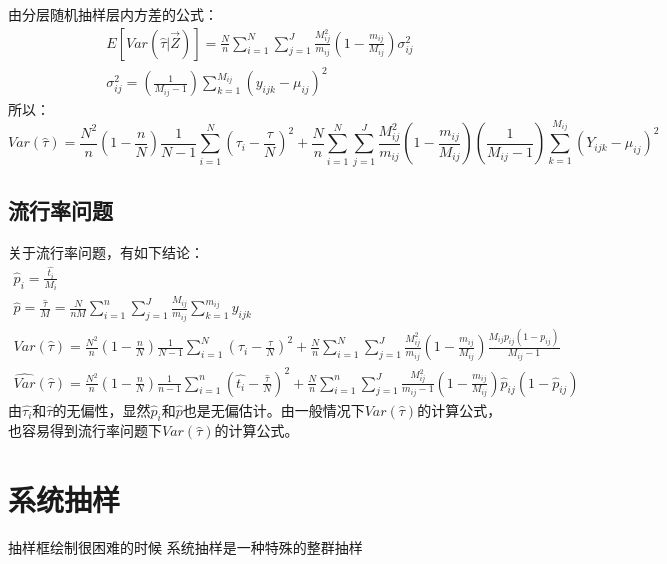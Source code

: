 由分层随机抽样层内方差的公式：
\begin{gather*}
	E[Var(\hat{\tau}|\overrightarrow{Z})]=\frac{N}{n}\sum_{i=1}^{N}\sum_{j=1}^{J}\frac{M_{ij}^2}{m_{ij}}\left(1-\frac{m_{ij}}{M_{ij}}\right)\sigma_{ij}^2 \\
	\sigma_{ij}^2=\left(\frac{1}{M_{ij}-1}\right)\sum_{k=1}^{M_{ij}}\left(y_{ijk}-\mu_{ij}\right)^2
\end{gather*}
所以：
\begin{equation*}
	Var(\hat{\tau})=\frac{N^2}{n}\left(1-\frac{n}{N}\right)\frac{1}{N-1}\sum_{i=1}^{N}\left(\tau_i-\frac{\tau}{N}\right)^2+\frac{N}{n}\sum_{i=1}^{N}\sum_{j=1}^{J}\frac{M_{ij}^2}{m_{ij}}\left(1-\frac{m_{ij}}{M_{ij}}\right)\left(\frac{1}{M_{ij}-1}\right)\sum_{k=1}^{M_{ij}}\left(Y_{ijk}-\mu_{ij}\right)^2
\end{equation*}

\subsection{流行率问题}
关于流行率问题，有如下结论：
\begin{gather*}
	\hat{p}_i=\frac{\hat{t_i}}{M_i} \\
	\hat{p}=\frac{\hat{\tau}}{M}=\frac{N}{nM}\sum_{i=1}^{n}\sum_{j=1}^{J}\frac{M_{ij}}{m_{ij}}\sum_{k=1}^{m_{ij}}y_{ijk} \\
	Var(\hat{\tau})=\frac{N^2}{n}\left(1-\frac{n}{N}\right)\frac{1}{N-1}\sum_{i=1}^{N}\left(\tau_i-\frac{\tau}{N}\right)^2+\frac{N}{n}\sum_{i=1}^{N}\sum_{j=1}^{J}\frac{M_{ij}^2}{m_{ij}}\left(1-\frac{m_{ij}}{M_{ij}}\right)\frac{M_{ij}p_{ij}(1-p_{ij})}{M_{ij}-1} \\
	\widehat{Var}(\hat{\tau})=\frac{N^2}{n}\left(1-\frac{n}{N}\right)\frac{1}{n-1}\sum_{i=1}^{n}\left(\hat{t_i}-\frac{\hat{\tau}}{N}\right)^2+\frac{N}{n}\sum_{i=1}^{n}\sum_{j=1}^{J}\frac{M_{ij}^2}{m_{ij}-1}\left(1-\frac{m_{ij}}{M_{ij}}\right)\hat{p}_{ij}(1-\hat{p}_{ij}) 
\end{gather*}
由$\hat{\tau_i}$和$\hat{\tau}$的无偏性，显然$\hat{p}_i$和$\hat{p}$也是无偏估计。由一般情况下$Var(\hat{\tau})$的计算公式，也容易得到流行率问题下$Var(\hat{\tau})$的计算公式。
\section{系统抽样}
抽样框绘制很困难的时候
系统抽样是一种特殊的整群抽样
